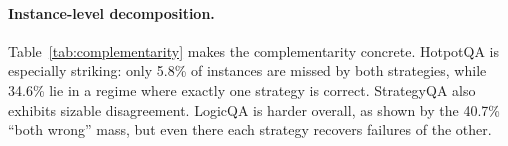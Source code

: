 \documentclass[11pt]{article}
\begin{document}
\begin{table}[h]
\centering
\small
{}
\caption{Instance-level complementarity decomposition. ``CoT only'' means CoT is correct and A* is wrong; ``A* only'' means the reverse.}
\label{tab:complementarity}
\end{table}

\paragraph{Instance-level decomposition.}
Table~\ref{tab:complementarity} makes the complementarity concrete. HotpotQA is especially striking: only 5.8\% of instances are missed by both strategies, while 34.6\% lie in a regime where exactly one strategy is correct. StrategyQA also exhibits sizable disagreement. LogicQA is harder overall, as shown by the 40.7\% ``both wrong'' mass, but even there each strategy recovers failures of the other.




\end{document}
